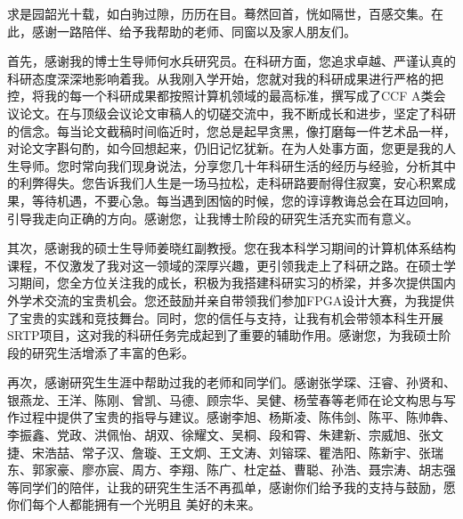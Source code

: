 \cleardoublepage
{}

求是园韶光十载，如白驹过隙，历历在目。蓦然回首，恍如隔世，百感交集。在此，感谢一路陪伴、给予我帮助的老师、同窗以及家人朋友们。


首先，感谢我的博士生导师何水兵研究员。在科研方面，您追求卓越、严谨认真的科研态度深深地影响着我。从我刚入学开始，您就对我的科研成果进行严格的把控，将我的每一个科研成果都按照计算机领域的最高标准，撰写成了CCF A类会议论文。在与顶级会议论文审稿人的切磋交流中，我不断成长和进步，坚定了科研的信念。每当论文截稿时间临近时，您总是起早贪黑，像打磨每一件艺术品一样，对论文字斟句酌，如今回想起来，仍旧记忆犹新。在为人处事方面，您更是我的人生导师。您时常向我们现身说法，分享您几十年科研生活的经历与经验，分析其中的利弊得失。您告诉我们人生是一场马拉松，走科研路要耐得住寂寞，安心积累成果，等待机遇，不要心急。每当遇到困恼的时候，您的谆谆教诲总会在耳边回响，引导我走向正确的方向。感谢您，让我博士阶段的研究生活充实而有意义。

其次，感谢我的硕士生导师姜晓红副教授。您在我本科学习期间的计算机体系结构课程，不仅激发了我对这一领域的深厚兴趣，更引领我走上了科研之路。在硕士学习期间，您全方位关注我的成长，积极为我搭建科研实习的桥梁，并多次提供国内外学术交流的宝贵机会。您还鼓励并亲自带领我们参加FPGA设计大赛，为我提供了宝贵的实践和竞技舞台。同时，您的信任与支持，让我有机会带领本科生开展SRTP项目，这对我的科研任务完成起到了重要的辅助作用。感谢您，为我硕士阶段的研究生活增添了丰富的色彩。

再次，感谢研究生生涯中帮助过我的老师和同学们。感谢张学琛、汪睿、孙贤和、银燕龙、王洋、陈刚、曾凯、马德、顾宗华、吴健、杨莹春等老师在论文构思与写作过程中提供了宝贵的指导与建议。感谢李旭、杨斯凌、陈伟剑、陈平、陈帅犇、李振鑫、党政、洪佩怡、胡双、徐耀文、吴桐、段和霄、朱建新、宗威旭、张文捷、宋浩喆、常子汉、詹璇、王文炯、王文涛、刘镕琛、瞿浩阳、陈新宇、张瑞东、郭家豪、廖亦宸、周方、李翔、陈广、杜定益、曹聪、孙浩、聂宗涛、胡志强等同学们的陪伴，让我的研究生生活不再孤单，感谢你们给予我的支持与鼓励，愿你们每个人都能拥有一个光明且 美好的未来。

